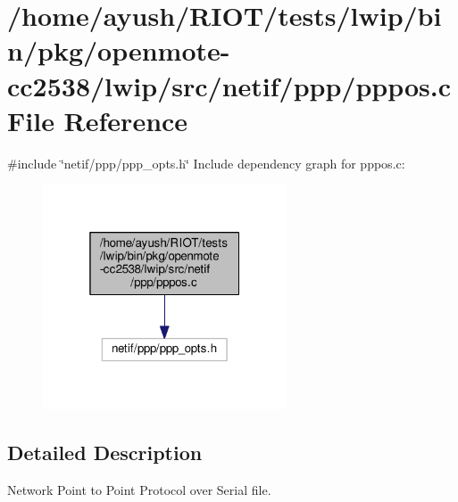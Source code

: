 \hypertarget{openmote-cc2538_2lwip_2src_2netif_2ppp_2pppos_8c}{}\section{/home/ayush/\+R\+I\+O\+T/tests/lwip/bin/pkg/openmote-\/cc2538/lwip/src/netif/ppp/pppos.c File Reference}
\label{openmote-cc2538_2lwip_2src_2netif_2ppp_2pppos_8c}
{\ttfamily \#include \char`\"{}netif/ppp/ppp\+\_\+opts.\+h\char`\"{}}\newline
Include dependency graph for pppos.\+c\+:
\nopagebreak
\begin{figure}[H]
\begin{center}
\leavevmode
\includegraphics[width=205pt]{openmote-cc2538_2lwip_2src_2netif_2ppp_2pppos_8c__incl}
\end{center}
\end{figure}


\subsection{Detailed Description}
Network Point to Point Protocol over Serial file. 